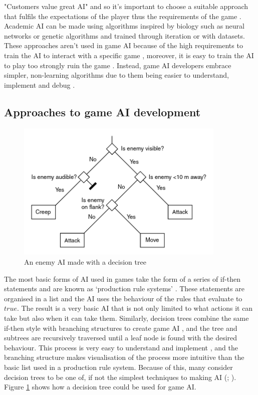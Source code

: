 \documentclass[11pt, a4paper]{report}
\begin{document}
 "Customers value great AI" \parencite[60]{nareyek2004ai} and so it's important to choose a suitable approach that fulfils the expectations of the player thus the requirements of the game \parencite[19]{millington2019ai}. Academic AI can be made using algorithms inspired by biology such as neural networks or genetic algorithms and trained through iteration or with datasets. These approaches aren't used in game AI because of the high requirements to train the AI to interact with a specific game \parencite[64]{nareyek2004ai}, moreover, it is easy to train the AI to play too strongly ruin the game \parencite[13]{tozour2002evolution}. Instead, game AI developers embrace simpler, non-learning algorithms due to them being easier to understand, implement and debug \parencite[7]{tozour2002evolution}.

\subsection{Approaches to game AI development}
\label{subsec:approachesToGameAIDevelopment}

\begin{figure}[!h]
  \centering
  \includegraphics[width=10cm]{img/decision_trees.png}
  \caption{An enemy AI made with a decision tree \parencite[296]{millington2019ai}}
  \label{fig:decisionTree}
\end{figure}

The most basic forms of AI used in games take the form of a series of if-then statements and are known as `production rule systems' \parencite{tozour2002evolution}. These statements are organised in a list and the AI uses the behaviour of the rules that evaluate to $true$. The result is a very basic AI that is not only limited to what actions it can take but also when it can take them. Similarly, decision trees combine the same if-then style with branching structures to create game AI \parencite[62]{nareyek2004ai}, and the tree and subtrees are recursively traversed until a leaf node is found with the desired behaviour. This process is very easy to understand and implement \parencite[295]{millington2019ai}, and the branching structure makes visualisation of the process more intuitive than the basic list used in a production rule system. Because of this, many consider decision trees to be one of, if not the simplest techniques to making AI  (\cite[295]{millington2019ai}; \cite[7]{tozour2002evolution}). Figure \ref{fig:decisionTree} shows how a decision tree could be used for game AI.
\end{document}

